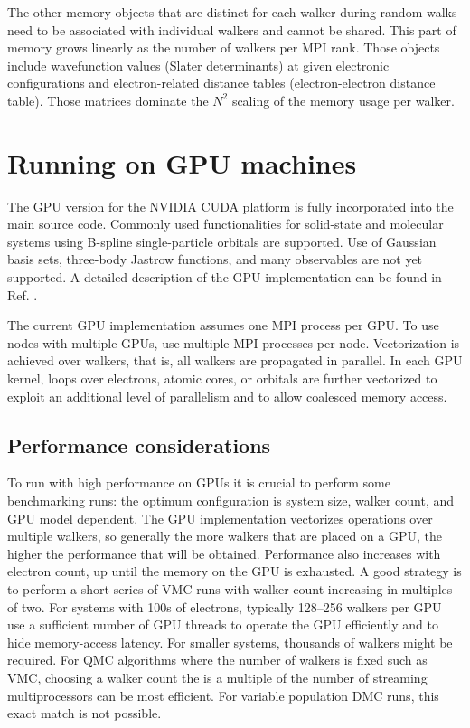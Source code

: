 The other memory objects that are distinct for each walker during random walks need to be associated with individual walkers and cannot be shared. This part of memory grows linearly as the number of walkers per MPI rank. Those objects include wavefunction values (Slater determinants) at given electronic configurations and electron-related distance tables (electron-electron distance table). Those matrices dominate the $N^2$ scaling of the memory usage per walker.

\section{Running on GPU machines}
\label{sec:gpurunning}

The GPU version for the NVIDIA CUDA platform is fully incorporated into
the main source code. Commonly used functionalities for
solid-state and molecular systems using B-spline single-particle
orbitals are supported. Use of Gaussian basis sets, three-body
Jastrow functions, and many observables are not yet supported. A detailed description of the GPU
implementation can be found in Ref. \cite{EslerKimCeperleyShulenburger2012}.

The current GPU implementation assumes one MPI process per GPU. To use
nodes with multiple GPUs, use multiple MPI processes per node.
Vectorization is achieved over walkers, that is, all walkers are
propagated in parallel. In each GPU kernel, loops over electrons,
atomic cores, or orbitals are further vectorized to exploit an
additional level of parallelism and to allow coalesced memory access.


\subsection{Performance considerations}
\label{sec:gpu:performance}

To run with high performance on GPUs it is crucial to perform some
benchmarking runs: the optimum configuration is system size, walker
count, and GPU model dependent. The GPU implementation vectorizes
operations over multiple walkers, so generally the more walkers that
are placed on a GPU, the higher the performance that will be
obtained. Performance also increases with electron count, up until the
memory on the GPU is exhausted. A good strategy is to perform a short
series of VMC runs with walker count increasing in multiples of
two. For systems with 100s of electrons, typically 128--256 walkers per
GPU use a sufficient number of GPU threads to operate the GPU
efficiently and to hide memory-access latency. For smaller systems,
thousands of walkers might be required. For QMC algorithms where the number of
walkers is fixed such as VMC, choosing a walker count the is a multiple of the
number of streaming multiprocessors can be most efficient. For
variable population DMC runs, this exact match is not possible.

